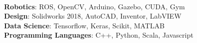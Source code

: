 \ifdefined\ONEPAGE
\\
\textbf{Robotics}: ROS, OpenCV, Arduino, Gazebo, CUDA, Gym\\
\textbf{Design}: Solidworks 2018, AutoCAD, Inventor, LabVIEW\\
\textbf{Data Science}: Tensorflow, Keras, Scikit, MATLAB\\
\textbf{Programming Languages}: C++, Python, Scala, Javascript\\
\else
\fi
